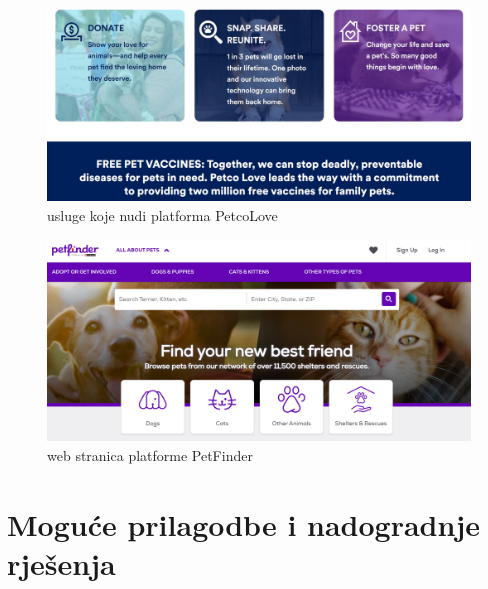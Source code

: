 		\begin{figure}[H]
			\includegraphics[scale = 0.4]{slike/petcoLove.PNG} 
			\centering
			\caption{usluge koje nudi platforma PetcoLove}
			\label{petcoLove}
		\end{figure}
		
		\begin{figure}[H]
			\includegraphics[scale = 0.5]{slike/petFinder.PNG} 
			\centering
			\caption{web stranica platforme PetFinder}
			\label{petcoLove}
		\end{figure}
		
		\pagebreak
		
		
		\section{Moguće prilagodbe i nadogradnje rješenja}
		
